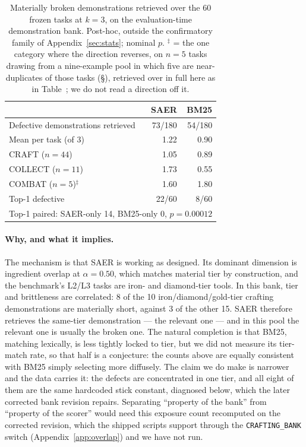 \documentclass[letterpaper]{article} %
\newcommand{\appref}[1]{Appendix~\ref{#1}}
\newcommand{\bodyref}[1]{\getrefnumber{#1}}
\begin{document}
\begin{table}[htbp]
\centering
\caption{Materially broken demonstrations retrieved over the 60 frozen
tasks at $k{=}3$, on the evaluation-time demonstration bank.  Post-hoc,
outside the confirmatory family of \appref{sec:stats}; nominal $p$.
$^{\ddagger}$ = the one category where the direction reverses, on $n{=}5$
tasks drawing from a nine-example pool in which five are near-duplicates of those
tasks (\S\bodyref{sec:combat_design}), retrieved over in full here as in
Table~\bodyref{tab:main}; we do not read a direction off
it.}
\label{tab:exposure}
\small
\begin{tabular}{lrr}
\toprule
& SAER & BM25 \\
\midrule
Defective demonstrations retrieved & 73/180 & 54/180 \\
Mean per task (of 3)               & 1.22 & 0.90 \\
\quad CRAFT ($n{=}44$)             & 1.05 & 0.89 \\
\quad COLLECT ($n{=}11$)           & 1.73 & 0.55 \\
\quad COMBAT ($n{=}5$)$^{\ddagger}$ & 1.60 & 1.80 \\
Top-1 defective                    & 22/60 & 8/60 \\
\midrule
\multicolumn{3}{l}{Top-1 paired: SAER-only 14, BM25-only 0, $p{=}0.00012$} \\
\bottomrule
\end{tabular}
\end{table}

\paragraph{Why, and what it implies.}  The mechanism is that SAER is
working as designed.  Its dominant dimension is ingredient overlap at
$\alpha{=}0.50$, which matches material tier by construction, and the
benchmark's L2/L3 tasks are iron- and diamond-tier tools.  In this bank,
tier and brittleness are correlated: 8 of the 10 iron/diamond/gold-tier
crafting demonstrations are materially short, against 3 of the other 15.
SAER therefore retrieves the same-tier demonstration --- the relevant one ---
and in this pool the relevant one is usually the broken one.  The natural
completion is that BM25, matching lexically, is less tightly locked to tier,
but we did not measure its tier-match rate, so that half is a conjecture: the
counts above are equally consistent with BM25 simply selecting more diffusely.
The claim we do make is narrower and the data carries it: the defects are
concentrated in one tier, and all eight of them are the same hardcoded stick
constant, diagnosed below, which the later corrected bank revision repairs.
Separating ``property of the bank'' from ``property of the scorer'' would need
this exposure count recomputed on the corrected revision, which the shipped
scripts support through the \texttt{CRAFTING\_BANK} switch
(\appref{app:overlap}) and we have not run.
\end{document}
